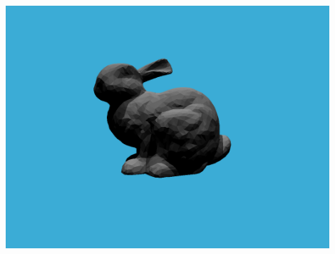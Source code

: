 \documentclass{ctexart}
\begin{document}
    \begin{center}
        \includegraphics[width=0.9\textwidth]{pics/binary.png}
    \end{center}
\end{document}
